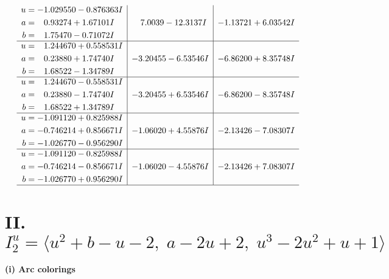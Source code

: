 \documentclass[1p]{elsarticle_modified}
\theoremstyle{definition}
\begin{document}
$$\begin{array}{c|c|c}
\begin{aligned}
u &= -1.029550 - 0.876363 I \\
a &= \phantom{-}0.93274 + 1.67101 I \\
b &= \phantom{-}1.75470 - 0.71072 I\end{aligned}
 & \phantom{-}7.0039 - 12.3137 I & -1.13721 + 6.03542 I \\ \hline\begin{aligned}
u &= \phantom{-}1.244670 + 0.558531 I \\
a &= \phantom{-}0.23880 + 1.74740 I \\
b &= \phantom{-}1.68522 - 1.34789 I\end{aligned}
 & -3.20455 - 6.53546 I & -6.86200 + 8.35748 I \\ \hline\begin{aligned}
u &= \phantom{-}1.244670 - 0.558531 I \\
a &= \phantom{-}0.23880 - 1.74740 I \\
b &= \phantom{-}1.68522 + 1.34789 I\end{aligned}
 & -3.20455 + 6.53546 I & -6.86200 - 8.35748 I \\ \hline\begin{aligned}
u &= -1.091120 + 0.825988 I \\
a &= -0.746214 + 0.856671 I \\
b &= -1.026770 - 0.956290 I\end{aligned}
 & -1.06020 + 4.55876 I & -2.13426 - 7.08307 I \\ \hline\begin{aligned}
u &= -1.091120 - 0.825988 I \\
a &= -0.746214 - 0.856671 I \\
b &= -1.026770 + 0.956290 I\end{aligned}
 & -1.06020 - 4.55876 I & -2.13426 + 7.08307 I\\
 \hline 
 \end{array}$$\newpage\newpage\renewcommand{\arraystretch}{1}
\centering \section*{II. $I^u_{2}= \langle u^2+b- u-2,\;a-2 u+2,\;u^3-2 u^2+u+1 \rangle$}
\flushleft \textbf{(i) Arc colorings}\\
\end{document}

